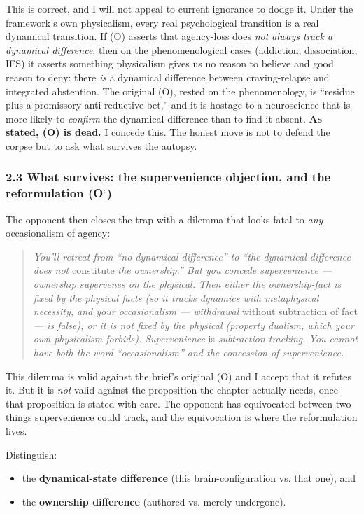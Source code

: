 \documentclass[11pt]{article}
\begin{document}
This is correct, and I will not appeal to current ignorance to dodge it. Under the framework's own physicalism, every real psychological transition is a real dynamical transition. If (O) asserts that agency-loss does \emph{not always track a dynamical difference}, then on the phenomenological cases (addiction, dissociation, IFS) it asserts something physicalism gives us no reason to believe and good reason to deny: there \emph{is} a dynamical difference between craving-relapse and integrated abstention. The original (O), rested on the phenomenology, is ``residue plus a promissory anti-reductive bet,'' and it is hostage to a neuroscience that is more likely to \emph{confirm} the dynamical difference than to find it absent. \textbf{As stated, (O) is dead.} I concede this. The honest move is not to defend the corpse but to ask what survives the autopsy.

\subsubsection*{2.3 What survives: the supervenience objection, and the reformulation (O\ensuremath{`})}

The opponent then closes the trap with a dilemma that looks fatal to \emph{any} occasionalism of agency:

\begin{quote}
\emph{You'll retreat from ``no dynamical difference'' to ``the dynamical difference does not} constitute \emph{the ownership.'' But you concede supervenience — ownership supervenes on the physical. Then either the ownership-fact is fixed by the physical facts (so it tracks dynamics with metaphysical necessity, and your occasionalism — withdrawal} without subtraction of fact \emph{— is false), or it is not fixed by the physical (property dualism, which your own physicalism forbids). Supervenience} is \emph{subtraction-tracking. You cannot have both the word ``occasionalism'' and the concession of supervenience.}
\end{quote}

This dilemma is valid against the brief's original (O) and I accept that it refutes it. But it is \emph{not} valid against the proposition the chapter actually needs, once that proposition is stated with care. The opponent has equivocated between two things supervenience could track, and the equivocation is where the reformulation lives.

Distinguish:

\begin{itemize}
\item the \textbf{dynamical-state difference} (this brain-configuration vs. that one), and
\item the \textbf{ownership difference} (authored vs. merely-undergone).
\end{itemize}
\end{document}
